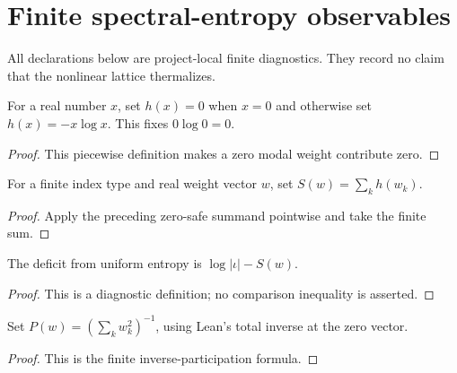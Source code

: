 
\chapter{Finite spectral-entropy observables}
\label{ch:ArchonPhysics_Generated_problem_entropy}

All declarations below are project-local finite diagnostics. They record no claim that the nonlinear lattice thermalizes.

\begin{definition}
\label{def:entropy:summand}
For a real number $x$, set $h(x)=0$ when $x=0$ and otherwise set $h(x)=-x\log x$. This fixes $0\log 0=0$.
\end{definition}
\begin{proof}This piecewise definition makes a zero modal weight contribute zero.\end{proof}

\begin{definition}
\label{def:entropy:spectral}
For a finite index type and real weight vector $w$, set $S(w)=\sum_kh(w_k)$.
\end{definition}
\begin{proof}Apply the preceding zero-safe summand pointwise and take the finite sum.\end{proof}

\begin{definition}
\label{def:entropy:deficit}
The deficit from uniform entropy is $\log|\iota|-S(w)$.
\end{definition}
\begin{proof}This is a diagnostic definition; no comparison inequality is asserted.\end{proof}

\begin{definition}
\label{def:entropy:participation}
Set $P(w)=(\sum_kw_k^2)^{-1}$, using Lean's total inverse at the zero vector.
\end{definition}
\begin{proof}This is the finite inverse-participation formula.\end{proof}

